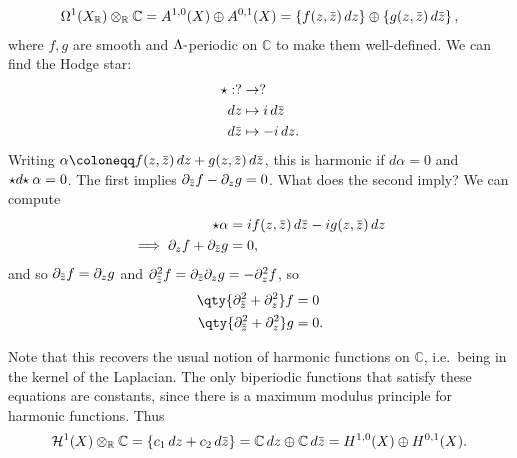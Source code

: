 \begin{example}[?]
\begin{align*}
\Omega^1(X_{\mathbb{R}}) \otimes_{\mathbb{R}}{\mathbb{C}}= A^{1, 0}(X) \oplus A^{0, 1}(X) = \left\{{ f(z, \mkern 1.5mu\overline{\mkern-1.5muz\mkern-1.5mu}\mkern 1.5mu )\,dz}\right\} \oplus \left\{{ g(z, \mkern 1.5mu\overline{\mkern-1.5muz\mkern-1.5mu}\mkern 1.5mu)\,d\mkern 1.5mu\overline{\mkern-1.5muz\mkern-1.5mu}\mkern 1.5mu }\right\}
,\end{align*}
where \(f,g\) are smooth and \(\Lambda{\hbox{-}}\)periodic on
\({\mathbb{C}}\) to make them well-defined. We can find the Hodge star:
\begin{align*}
\star: ? &\to ? \\
\,dz& \mapsto i\,d\mkern 1.5mu\overline{\mkern-1.5muz\mkern-1.5mu}\mkern 1.5mu \\
\,d\mkern 1.5mu\overline{\mkern-1.5muz\mkern-1.5mu}\mkern 1.5mu &\mapsto -i\,dz
.\end{align*}
Writing
\(\alpha\coloneqq f(z, \mkern 1.5mu\overline{\mkern-1.5muz\mkern-1.5mu}\mkern 1.5mu)\,dz+ g(z, \mkern 1.5mu\overline{\mkern-1.5muz\mkern-1.5mu}\mkern 1.5mu) \,d\mkern 1.5mu\overline{\mkern-1.5muz\mkern-1.5mu}\mkern 1.5mu\),
this is harmonic if \(d \alpha = 0\) and
\(\star{d} \mkern-5mu \star\alpha = 0\). The first implies
\(\partial_{\mkern 1.5mu\overline{\mkern-1.5muz\mkern-1.5mu}\mkern 1.5mu} f - \partial_{z} g = 0\).
What does the second imply? We can compute
\begin{align*}
\star\alpha 
&= if(z, \mkern 1.5mu\overline{\mkern-1.5muz\mkern-1.5mu}\mkern 1.5mu ) \,d\mkern 1.5mu\overline{\mkern-1.5muz\mkern-1.5mu}\mkern 1.5mu - ig(z, \mkern 1.5mu\overline{\mkern-1.5muz\mkern-1.5mu}\mkern 1.5mu) \,dz\\
\implies \partial_z f + \partial_{\mkern 1.5mu\overline{\mkern-1.5muz\mkern-1.5mu}\mkern 1.5mu} g 
&= 0
,\end{align*}
and so
\(\partial_{\mkern 1.5mu\overline{\mkern-1.5muz\mkern-1.5mu}\mkern 1.5mu} f = \partial_z g\)
and
\(\partial_{\mkern 1.5mu\overline{\mkern-1.5muz\mkern-1.5mu}\mkern 1.5mu}^2 f = \partial_{\mkern 1.5mu\overline{\mkern-1.5muz\mkern-1.5mu}\mkern 1.5mu} \partial_z g = - \partial_z^2 f\),
so
\begin{align*}
\qty{ \partial_{\mkern 1.5mu\overline{\mkern-1.5muz\mkern-1.5mu}\mkern 1.5mu}^2 + \partial_z^2 }f &= 0 \\
\qty{ \partial_{\mkern 1.5mu\overline{\mkern-1.5muz\mkern-1.5mu}\mkern 1.5mu}^2 + \partial_z^2 }g &= 0 
.\end{align*}

Note that this recovers the usual notion of harmonic functions on
\({\mathbb{C}}\), i.e.~being in the kernel of the Laplacian. The only
biperiodic functions that satisfy these equations are constants, since
there is a maximum modulus principle for harmonic functions. Thus
\begin{align*}
{\mathcal{H}}^1(X) \otimes_{\mathbb{R}}{\mathbb{C}}= \left\{{ c_1 \,dz+ c_2 \,d\mkern 1.5mu\overline{\mkern-1.5muz\mkern-1.5mu}\mkern 1.5mu }\right\} = {\mathbb{C}}\,dz\oplus {\mathbb{C}}\,d\mkern 1.5mu\overline{\mkern-1.5muz\mkern-1.5mu}\mkern 1.5mu = H^{1, 0}(X) \oplus H^{0, 1}(X) 
.\end{align*}

\end{example}

